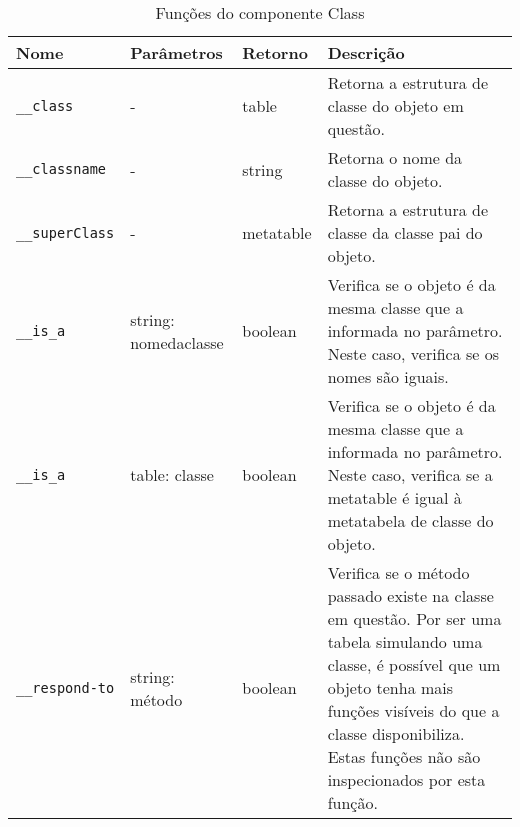 \begin{table}[htb]
\ABNTEXfontereduzida
\caption[Funções do componente Class]{Funções do componente Class}
\label{tab-api-class}
\begin{tabular}{p{2.6cm}|p{2.6cm}|p{2.25cm}|p{6.8cm}}
\textbf{Nome} & \textbf{Parâmetros} & \textbf{Retorno} & \textbf{Descrição} \\
\hline
\verb|__class| & - & table & Retorna a estrutura de classe do objeto em questão. \\
\hline
\verb|__classname| & - & string & Retorna o nome da classe do objeto. \\
\hline
\verb|__superClass| & - & metatable & Retorna a estrutura de classe da classe pai do objeto. \\
\hline
\verb|__is_a| & string: nomedaclasse & boolean & Verifica se o objeto é da mesma classe que a informada no parâmetro. Neste caso, verifica se os nomes são iguais. \\
\hline
\verb|__is_a| & table: classe & boolean & Verifica se o objeto é da mesma classe que a informada no parâmetro. Neste caso, verifica se a metatable é igual à metatabela de classe do objeto. \\
\hline
\verb|__respond-to| & string: método & boolean & Verifica se o método passado existe na classe em questão. Por ser uma tabela simulando uma classe, é possível que um objeto tenha mais funções visíveis do que a classe disponibiliza. Estas funções não são inspecionados por esta função. \\
\end{tabular}
\end{table}